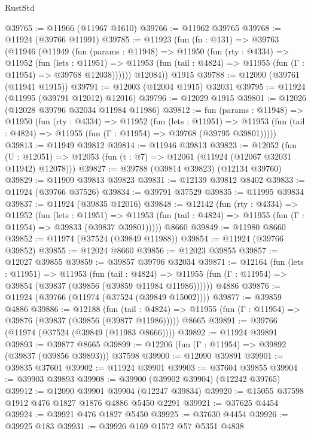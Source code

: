 \begin{lexlean}{RustStd}
\begin{coremodule}
@39765 := @11966 (@11967 @1610)
@39766 := @11962 @39765
@39768 := @11924 (@39766 @11991)
@39785 := @11923
    (fun (fn : @131) =>
    @39763
      (@11946
        (@11949
          (fun (params : @11948) =>
          @11950
            (fun (rty : @4334) =>
            @11952
              (fun (lets : @11951) =>
              @11953 (fun (tail : @4824) => @11955 (fun (Γ : @11954) => @39768 @12038))))))
        @12084))
    @1915
@39788 := @12090 (@39761 (@11941 @1915))
@39791 := @12003 (@12004 @1915) @32031
@39795 := @11924 (@11995 (@39791 @12012) @12016)
@39796 := @12029 @1915
@39801 := @12026 (@12028 @39796 @32034 @11984 @11986)
@39812 := fun (params : @11948) =>
  @11950
    (fun (rty : @4334) =>
    @11952
      (fun (lets : @11951) =>
      @11953 (fun (tail : @4824) => @11955 (fun (Γ : @11954) => @39768 (@39795 @39801)))))
@39813 := @11949 @39812
@39814 := @11946 @39813
@39823 := @12052
    (fun (U : @12051) => @12053 (fun (t : @7) => @12061 (@11924 (@12067 @32031 @11942) @12078)))
@39827 := @39788 (@39814 @39823) (@12134 @39760)
@39829 := @11909 @39813 @39823
@39831 := @12139 @39812 @8402
@39833 := @11924 (@39766 @37526)
@39834 := @39791 @37529
@39835 := @11995 @39834
@39837 := @11924 (@39835 @12016)
@39848 := @12142
    (fun (rty : @4334) =>
    @11952
      (fun (lets : @11951) =>
      @11953 (fun (tail : @4824) => @11955 (fun (Γ : @11954) => @39833 (@39837 @39801)))))
    @8660
@39849 := @11980 @8660
@39852 := @11974 (@37524 (@39849 @11988))
@39854 := @11924 (@39766 @39852)
@39855 := @12024 @8660
@39856 := @12023 @39855
@39857 := @12027 @39855
@39859 := @39857 @39796 @32034
@39871 := @12164
    (fun (lets : @11951) =>
    @11953
      (fun (tail : @4824) =>
      @11955 (fun (Γ : @11954) => @39854 (@39837 (@39856 (@39859 @11984 @11986))))))
    @4886
@39876 := @11924 (@39766 (@11974 (@37524 (@39849 @15002))))
@39877 := @39859 @4886
@39886 := @12188
    (fun (tail : @4824) => @11955 (fun (Γ : @11954) => @39876 (@39837 (@39856 (@39877 @11986)))))
    @8665
@39891 := @39766 (@11974 (@37524 (@39849 (@11983 @8666))))
@39892 := @11924 @39891
@39893 := @39877 @8665
@39899 := @12206 (fun (Γ : @11954) => @39892 (@39837 (@39856 @39893))) @37598
@39900 := @12090 @39891
@39901 := @39835 @37601
@39902 := @11924 @39901
@39903 := @37604 @39855
@39904 := @39903 @39893
@39908 := @39900 (@39902 @39904) (@12242 @39765)
@39912 := @12090 @39901 @39904 (@12247 @39834)
@39920 := @15055 @37598 @1912 @476 @1827 @1876 @4886 @5450 @2291
@39921 := @37625 @4454
@39924 := @39921 @476 @1827 @5450
@39925 := @37630 @4454
@39926 := @39925 @183
@39931 := @39926 @169 @1572 @57 @5351 @4838

\end{coremodule}
\end{lexlean}
